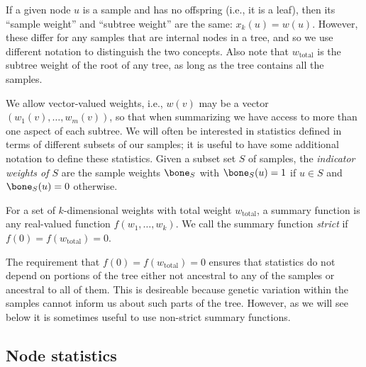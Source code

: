 \documentclass{article}
\newcommand{\iw}{w} %
\newcommand{\tiw}{w_\text{total}} %
\newcommand{\nw}{x} %
\begin{document}
If a given node $u$ is a sample and has no offspring (i.e., it is a leaf),
then its ``sample weight'' and ``subtree weight'' are the same: $\nw_k(u) = \iw(u)$.
However, 
these differ for any samples that are internal nodes in a tree,
and so we use different notation to distinguish the two concepts.
Also note that $\tiw$ is the subtree weight of the root of any tree,
as long as the tree contains all the samples.

We allow vector-valued weights,
i.e., $\iw(v)$ may be a vector $(\iw_1(v), \ldots, \iw_m(v))$,
so that when summarizing we have access to more than one aspect of each subtree.
We will often be interested in statistics defined in terms of different subsets of our samples;
it is useful to have some additional notation to define these statistics.
Given a subset set $S$ of samples,
the \emph{indicator weights of $S$} are the sample weights $\bone_S$ with
$\bone_S(u) = 1$ if $u \in S$ and $\bone_S(u) = 0$ otherwise.

\begin{definition}
    For a set of $k$-dimensional weights with total weight $\tiw$,
    a summary function is any real-valued function $f(w_1, \ldots, w_k)$.
    We call the summary function \emph{strict} if $f(0) = f(\tiw) = 0$.
\end{definition}

The requirement that $f(0) = f(\tiw) = 0$ ensures
that statistics do not depend on portions of the tree either not ancestral to any of the samples
or ancestral to all of them.
This is desireable because genetic variation within the samples
cannot inform us about such parts of the tree.
However, as we will see below it is sometimes useful to use non-strict summary functions.



\subsection*{Node statistics}
\end{document}
